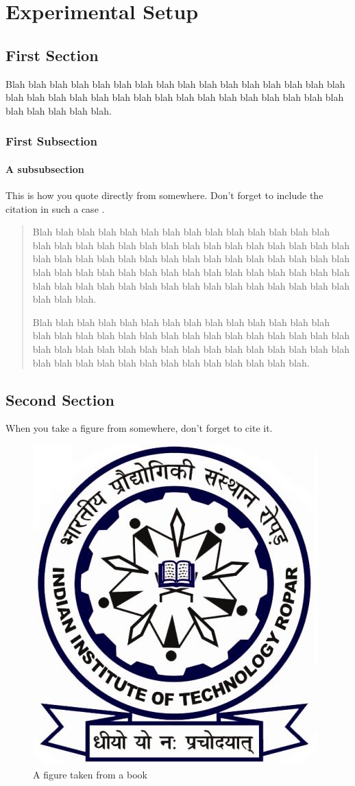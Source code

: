 \chapter{Experimental Setup}
\section{First Section}
Blah blah blah blah blah blah blah blah blah blah blah blah blah blah blah blah blah blah blah blah blah blah blah blah blah blah blah blah blah blah blah blah blah blah blah blah blah.
\subsection{First Subsection}
\subsubsection{A subsubsection}
This is how you quote directly from somewhere. Don't forget to include the citation in such a case \cite{texbook}.
\blockquote{
Blah blah blah blah blah blah blah blah blah blah blah blah blah blah blah blah blah blah blah blah blah blah blah blah blah blah blah blah blah blah blah blah blah blah blah blah blah blah blah blah blah blah blah blah blah blah blah blah blah blah blah blah blah blah blah blah blah blah blah blah blah blah blah blah blah blah blah blah blah blah blah blah blah blah blah blah blah.

Blah blah blah blah blah blah blah blah blah blah blah blah blah blah blah blah blah blah blah blah blah blah blah blah blah blah blah blah blah blah blah blah blah blah blah blah blah blah blah blah blah blah blah blah blah blah blah blah blah blah blah blah blah blah blah blah blah.
}

\section{Second Section}
When you take a figure from somewhere, don't forget to cite it.

\begin{figure}
\caption{A figure taken from a book \cite[Figure~6-3]{latexbook}}
\label{fig:anotherlabelforfigure}
\centering \includegraphics{Figures/IITRopar-Logo.jpg}
\end{figure}